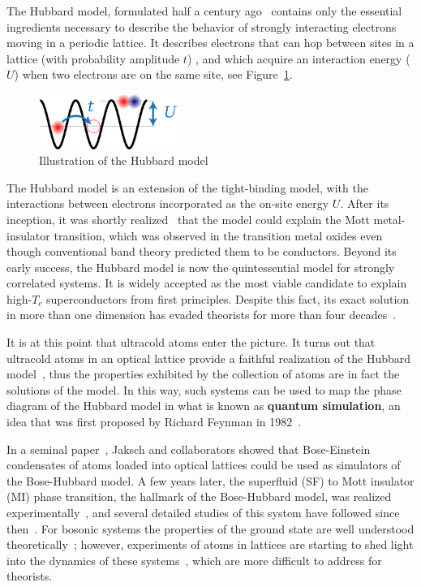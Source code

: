 \documentclass[oneside,11pt]{memoir}
\begin{document}
The Hubbard model, formulated half a century ago~\cite{hubbard50} contains only
the essential ingredients necessary to describe the  behavior of strongly
interacting electrons moving in a periodic lattice. It describes electrons that
can hop between sites in a lattice (with probability amplitude $t$) , and which
acquire an interaction energy ($U$) when two electrons are on the same site,
see Figure~\ref{fig:chap01hubbard}.  
\begin{figure} \centering
\includegraphics[width=0.4\textwidth]{../figures/hubbard/little-hubbard.png}
\caption[Hubbard model]{\small Illustration of the Hubbard model }
\label{fig:chap01hubbard}
\end{figure}
The Hubbard model is an extension of the tight-binding model, with the
interactions between electrons incorporated as the on-site energy $U$.
After its inception, it was shortly realized~\cite{Hubbard1964} that the model
could explain the Mott metal-insulator transition, which was observed in the
transition metal oxides even though conventional band theory predicted them to
be conductors.  Beyond its early success, the Hubbard model is now the
quintessential model for strongly correlated systems.  It is widely accepted as
the most viable candidate to explain high-$T_{c}$ superconductors from first
principles.   Despite this fact, its exact solution in more than one dimension
has evaded theorists for more than four decades~\cite{quintanilla2009strong}.

It is at this point that ultracold atoms enter the picture.   It turns out that
ultracold atoms in an optical lattice provide a faithful realization of the
Hubbard model~\cite{PhysRevLett.81.3108}, thus the properties exhibited by the
collection of atoms are in fact the solutions of the model.    In this way,
such systems can be used to map the phase diagram of the Hubbard model in what
is known as \textbf{quantum simulation}, an idea that was first proposed by
Richard Feynman in 1982~\cite{feynman1982simulating}. 

In a seminal paper~\cite{PhysRevLett.81.3108}, Jaksch and collaborators  showed
that Bose-Einstein condensates of atoms loaded into optical lattices could be
used as simulators of the Bose-Hubbard model.  A few years later, the superfluid
(SF) to Mott insulator (MI) phase transition, the hallmark of the Bose-Hubbard
model, was realized experimentally~\cite{Greiner2002}, and several detailed
studies of this system have followed since then~\cite{Gemelke2009,
Jimenez-Garcia2010, Trotzky2010, Mark2011, Zhang2012}.  For bosonic systems the
properties of the ground state are well understood
theoretically~\cite{freericks1994bosehubbard, trivedi1991mott,
PhysRevB.40.546};  however, experiments of atoms in lattices are starting to
shed light into the dynamics of these systems~\cite{Fukuhara2013}, which are
more difficult to address for theorists.  
\end{document}
